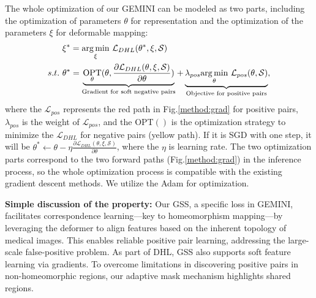 The whole optimization of our GEMINI can be modeled as two parts, including the optimization of parameters $\theta$ for representation and the optimization of the parameters $\xi$ for deformable mapping:
\begin{align}\label{equ:opt}
&\xi^{*}=\underset{\xi}{\arg\min}\ \mathcal{L}_{DHL}(\theta^{*},\xi,\mathcal{S})\\
s.t.\ & \theta^{*}=\underbrace{\underset{\theta}{\text{OPT}}(\theta,\frac{\partial\mathcal{L}_{DHL}(\theta,\xi,\mathcal{S})}{\partial \theta})}_{\text{Gradient for soft negative pairs}}+\underbrace{\lambda_{pos}\underset{\theta}{\arg\min}\ \mathcal{L}_{pos}(\theta,\mathcal{S})}_{\text{Objective for positive pairs}},\notag
\end{align}
where the $\mathcal{L}_{pos}$ represents the red path in Fig.\ref{method:grad} for positive pairs, $\lambda_{pos}$ is the weight of $\mathcal{L}_{pos}$, and the OPT$()$ is the optimization strategy to minimize the $\mathcal{L}_{DHL}$ for negative pairs (yellow path). If it is SGD \cite{bottou2010large} with one step, it will be $\theta^{*}\leftarrow\theta-\eta\frac{\partial\mathcal{L}_{DHL}(\theta,\xi,\mathcal{S})}{\partial \theta}$, where the $\eta$ is learning rate. The two optimization parts correspond to the two forward paths (Fig.\ref{method:grad}) in the inference process, so the whole optimization process is compatible with the existing gradient descent methods. We utilize the Adam \cite{kingma2014adam} for optimization.

\textbf{Simple discussion of the property:} Our GSS, a specific loss in GEMINI, facilitates correspondence learning—key to homeomorphism mapping—by leveraging the deformer to align features based on the inherent topology of medical images. This enables reliable positive pair learning, addressing the large-scale false-positive problem. As part of DHL, GSS also supports soft feature learning via gradients. To overcome limitations in discovering positive pairs in non-homeomorphic regions, our adaptive mask mechanism highlights shared regions.



